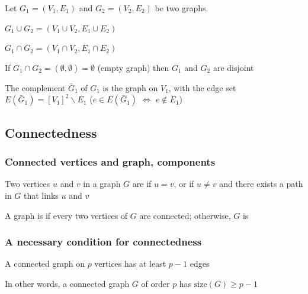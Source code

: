 \documentclass[aspectratio=43]{beamer}
\begin{document}
\begin{frame}
Let $G_1=(V_1,E_1)$ and $G_2=(V_2,E_2)$ be two graphs.
\begin{definition}
$G_1\cup G_2=(V_1\cup V_2,E_1\cup E_2)$
\end{definition}
\begin{definition}
$G_1\cap G_2=(V_1\cap V_2,E_1\cap E_2)$
\end{definition}
\begin{definition}
If $G_1\cap G_2=(\emptyset,\emptyset)= \emptyset$ (empty graph) then $G_1$ and $G_2$ are disjoint
\end{definition}
\begin{definition}[{Complement of $G_1$}]
The complement $\bar G_1$ of $G_1$ is the graph on $V_1$, with the edge set $E(\bar G_1)=[V_1]^2\backslash E_1$ ($e\in E(\bar G_1)$ $\iff$ $e\not \in E_1$)
\end{definition}
\end{frame}



\subsection{Connectedness}

\begin{frame}\frametitle{Connected vertices and graph, components}
\begin{definition}
Two vertices $u$ and $v$ in a graph $G$ are  if $u=v$, or if $u\not =v$ and there exists a path in $G$ that links $u$ and $v$
\end{definition}
\vfill
\begin{definition}
A graph is  if every two vertices of $G$ are connected; otherwise, $G$ is 
\end{definition}
\end{frame}

\begin{frame}\frametitle{A necessary condition for connectedness}
	\begin{theorem}
		A connected graph on $p$ vertices has at least $p-1$ edges
	\end{theorem}
	\vfill
	In other words, a connected graph $G$ of order $p$ has $\text{size}(G)\geq p-1$
\end{frame}
\end{document}
